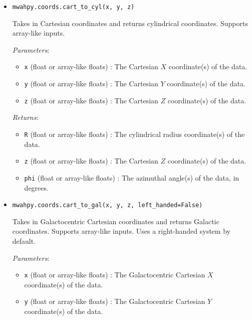 \documentclass{article}
\begin{document}
\begin{itemize}



\item \verb!mwahpy.coords.cart_to_cyl(x, y, z)!

Takes in Cartesian coordinates and returns cylindrical coordinates. Supports array-like inputs.

\textit{Parameters}: \begin{itemize}

\item \verb!x! (float or array-like floats) : The Cartesian $X$ coordinate(s) of the data.

\item \verb!y! (float or array-like floats) : The Cartesian $Y$ coordinate(s) of the data.

\item \verb!z! (float or array-like floats) : The Cartesian $Z$ coordinate(s) of the data.

\end{itemize}

\textit{Returns}: \begin{itemize}

\item \verb!R! (float or array-like floats) : The cylindrical radius coordinate(s) of the data.

\item \verb!z! (float or array-like floats) : The Cartesian $Z$ coordinate(s) of the data.

\item \verb!phi! (float or array-like floats) : The azimuthal angle(s) of the data, in degrees.

\end{itemize}



\item \verb!mwahpy.coords.cart_to_gal(x, y, z, left_handed=False)!

Takes in Galactocentric Cartesian coordinates and returns Galactic coordinates. Supports array-like inputs. Uses a right-handed system by default.

\textit{Parameters}: \begin{itemize}

\item \verb!x! (float or array-like floats) : The Galactocentric Cartesian $X$ coordinate(s) of the data.

\item \verb!y! (float or array-like floats) : The Galactocentric Cartesian $Y$ coordinate(s) of the data.


\end{itemize}
\end{itemize}
\end{document}
